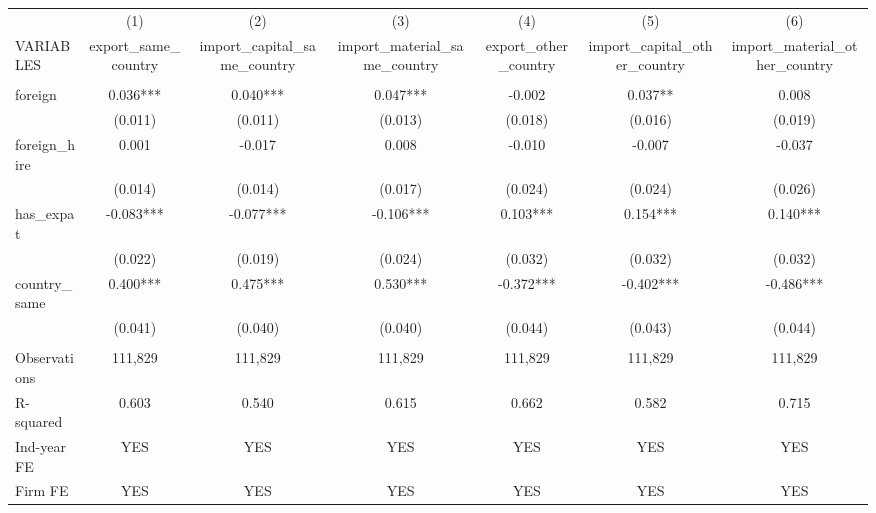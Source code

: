 \begin{tabular}{lcccccc} \hline
 & (1) & (2) & (3) & (4) & (5) & (6) \\
VARIABLES & export\_same\_country & import\_capital\_same\_country & import\_material\_same\_country & export\_other\_country & import\_capital\_other\_country & import\_material\_other\_country \\ \hline
 &  &  &  &  &  &  \\
foreign & 0.036*** & 0.040*** & 0.047*** & -0.002 & 0.037** & 0.008 \\
 & (0.011) & (0.011) & (0.013) & (0.018) & (0.016) & (0.019) \\
foreign\_hire & 0.001 & -0.017 & 0.008 & -0.010 & -0.007 & -0.037 \\
 & (0.014) & (0.014) & (0.017) & (0.024) & (0.024) & (0.026) \\
has\_expat & -0.083*** & -0.077*** & -0.106*** & 0.103*** & 0.154*** & 0.140*** \\
 & (0.022) & (0.019) & (0.024) & (0.032) & (0.032) & (0.032) \\
country\_same & 0.400*** & 0.475*** & 0.530*** & -0.372*** & -0.402*** & -0.486*** \\
 & (0.041) & (0.040) & (0.040) & (0.044) & (0.043) & (0.044) \\
 &  &  &  &  &  &  \\
Observations & 111,829 & 111,829 & 111,829 & 111,829 & 111,829 & 111,829 \\
R-squared & 0.603 & 0.540 & 0.615 & 0.662 & 0.582 & 0.715 \\
Ind-year FE & YES & YES & YES & YES & YES & YES \\
 Firm FE & YES & YES & YES & YES & YES & YES \\ \hline
\end{tabular}
